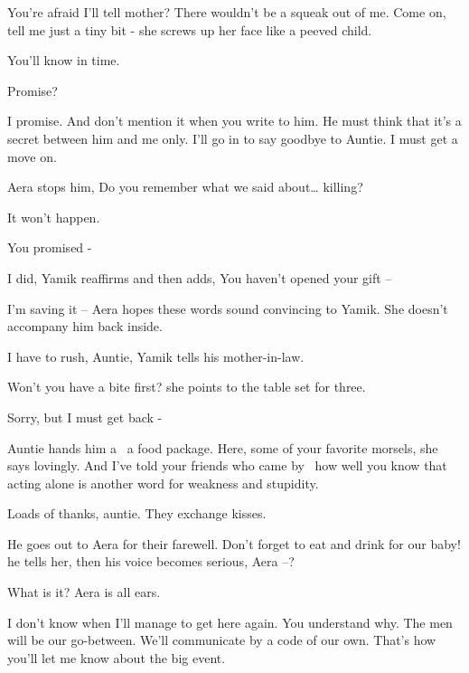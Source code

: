 \documentclass[letterpaper]{article}
\begin{document}
{\textquotedbl}You're afraid I'll tell mother? There wouldn't be a squeak out of me. Come on, tell me just a tiny bit
-{\textquotedbl} she screws up her face like a peeved child. 

{\textquotedbl}You'll know in time.{\textquotedbl} 

{\textquotedbl}Promise?{\textquotedbl} 

{\textquotedbl}I promise. And don't mention it when you write to him. He must think that it's a secret between him and
me only. I'll go in to say goodbye to Auntie. I must get a move on.{\textquotedbl} 

Aera stops him, {\textquotedbl}Do you remember what we said about{\dots} killing?{\textquotedbl} 

{\textquotedbl}It won't happen.{\textquotedbl} 

{\textquotedbl}You promised -{\textquotedbl} 

{\textquotedbl}I did,{\textquotedbl} Yamik reaffirms and then adds, {\textquotedbl}You haven't opened your gift
--{\textquotedbl}

{\textquotedbl}I'm saving it --{\textquotedbl} Aera hopes these words sound convincing to Yamik. She doesn't accompany
him back inside.

{\textquotedbl}I have to rush, Auntie,{\textquotedbl} Yamik tells his mother-in-law. 

{\textquotedbl}Won't you have a bite first?{\textquotedbl} she points to the table set for three. 

{\textquotedbl}Sorry, but I must get back -{\textquotedbl} 

Auntie hands him a \ a food package. {\textquotedbl}Here, some of your favorite morsels,{\textquotedbl} she says
lovingly. {\textquotedbl}And I've told your friends who came by \ how well you know that acting alone is another word
for weakness and stupidity.{\textquotedbl} 

{\textquotedbl}Loads of thanks, auntie.{\textquotedbl} They exchange kisses. 

He goes out\textcolor{red}{ }to Aera for their farewell. {\textquotedbl}Don't forget to eat and drink for our
baby!{\textquotedbl} he tells her, then his voice becomes serious, {\textquotedbl}Aera --?{\textquotedbl}

{\textquotedbl}What is it?{\textquotedbl} Aera is all ears.

{\textquotedbl}I don't know when I'll manage to get here again. You understand why. The men will be our go-between.
We'll communicate by a code of our own. That's how you'll let me know about the big event.{\textquotedbl} 
\end{document}
